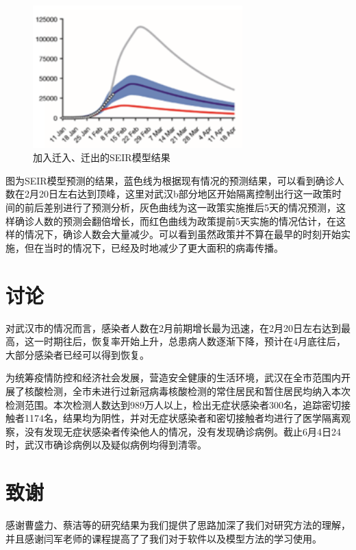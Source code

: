 \documentclass[12pt,hyperref,]{ctexart}
\begin{document}
\begin{figure}
\includegraphics[width=3.19in]{image/4.2.3} \caption{加入迁入、迁出的SEIR模型结果}\label{fig:4}
\end{figure}

图为SEIR模型预测的结果，蓝色线为根据现有情况的预测结果，可以看到确诊人数在2月20日左右达到顶峰，这里对武汉b部分地区开始隔离控制出行这一政策时间的前后差别进行了预测分析，灰色曲线为这一政策实施推后5天的情况预测，这样确诊人数的预测会翻倍增长，而红色曲线为政策提前5天实施的情况估计，在这样的情况下，确诊人数会大量减少。可以看到虽然政策并不算在最早的时刻开始实施，但在当时的情况下，已经及时地减少了更大面积的病毒传播。

\hypertarget{ux8ba8ux8bba}{%
\section{讨论}\label{ux8ba8ux8bba}}

对武汉市的情况而言，感染者人数在2月前期增长最为迅速，在2月20日左右达到最高，这一时期往后，恢复率开始上升，总患病人数逐渐下降，预计在4月底往后，大部分感染者已经可以得到恢复。

为统筹疫情防控和经济社会发展，营造安全健康的生活环境，武汉在全市范围内开展了核酸检测，全市未进行过新冠病毒核酸检测的常住居民和暂住居民均纳入本次检测范围。本次检测人数达到989万人以上，检出无症状感染者300名，追踪密切接触者1174名，结果均为阴性，并对无症状感染者和密切接触者均进行了医学隔离观察，没有发现无症状感染者传染他人的情况，没有发现确诊病例。截止6月4日24时，武汉市确诊病例以及疑似病例均得到清零。

\hypertarget{ux81f4ux8c22}{%
\section*{致谢}\label{ux81f4ux8c22}}

感谢曹盛力、蔡洁等的研究结果为我们提供了思路加深了我们对研究方法的理解，并且感谢闫军老师的课程提高了了我们对于软件以及模型方法的学习使用。
\end{document}
